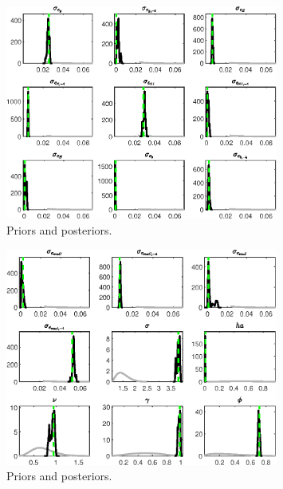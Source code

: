  
\begin{figure}[H]
\centering
\includegraphics[width=0.80\textwidth]{BRS_sectoral_wo_demand_shocks/Output/BRS_sectoral_wo_demand_shocks_PriorsAndPosteriors1}
\caption{Priors and posteriors.}\label{Fig:PriorsAndPosteriors:1}
\end{figure}
 
\begin{figure}[H]
\centering
\includegraphics[width=0.80\textwidth]{BRS_sectoral_wo_demand_shocks/Output/BRS_sectoral_wo_demand_shocks_PriorsAndPosteriors2}
\caption{Priors and posteriors.}\label{Fig:PriorsAndPosteriors:2}
\end{figure}
 
